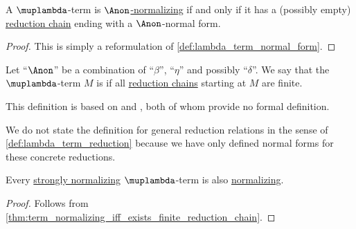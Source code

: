 \begin{proposition}\label{thm:term_normalizing_iff_exists_finite_reduction_chain}
  A \( \muplambda \)-term is \hyperref[def:lambda_term_normal_form]{\( \Anon \)-normalizing} if and only if it has a (possibly empty) \hyperref[def:lambda_term_reduction_chain]{reduction chain} ending with a \( \Anon \)-normal form.
\end{proposition}
\begin{proof}
  This is simply a reformulation of \cref{def:lambda_term_normal_form}.
\end{proof}

\begin{definition}\label{def:strongly_normalizing_lambda_term}\mimprovised
  Let \enquote{\( {\Anon} \)} be a combination of \enquote{\( \beta \)}, \enquote{\( \eta \)} and possibly \enquote{\( \delta \)}. We say that the \( \muplambda \)-term \( M \) is  if all \hyperref[def:lambda_term_reduction_chain]{reduction chains} starting at \( M \) are finite.
\end{definition}
\begin{comments}
  \item This definition is based on \cite[\S 4.3]{Barendregt1992LambdaCalculiWithTypes} and \cite[\S 4.2]{Mimram2020ProgramEqualsProof}, both of whom provide no formal definition.

  \item We do not state the definition for general reduction relations in the sense of \ref{def:lambda_term_reduction} because we have only defined normal forms for these concrete reductions.
\end{comments}

\begin{proposition}\label{thm:strongly_normalizing_term_is_normalizing}
  Every \hyperref[def:strongly_normalizing_lambda_term]{strongly normalizing} \( \muplambda \)-term is also \hyperref[def:lambda_term_normal_form]{normalizing}.
\end{proposition}
\begin{proof}
  Follows from \cref{thm:term_normalizing_iff_exists_finite_reduction_chain}.
\end{proof}

